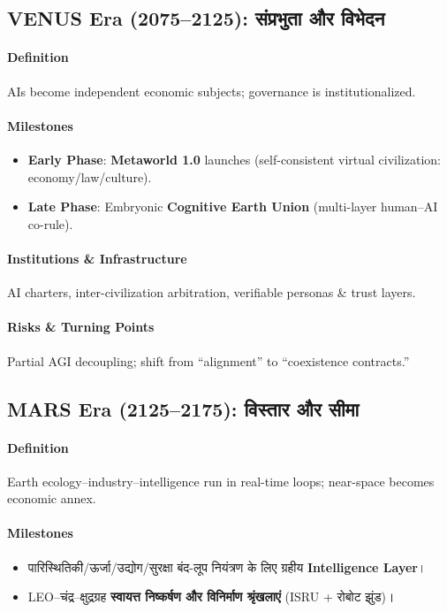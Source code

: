 \documentclass[11pt]{article}
\begin{document}
\begin{itemize}[noitemsep]
\begin{itemize}[noitemsep]
\begin{itemize}[noitemsep]
\begin{itemize}[noitemsep]
\begin{itemize}[noitemsep]
\begin{itemize}[noitemsep]
\subsection{VENUS Era (2075–2125): संप्रभुता और विभेदन}
\paragraph{Definition} AIs become independent economic subjects; governance is institutionalized.

\paragraph{Milestones}
\begin{itemize}[noitemsep]
  \item \textbf{Early Phase}: \textbf{Metaworld 1.0} launches (self-consistent virtual civilization: economy/law/culture).
  \item \textbf{Late Phase}: Embryonic \textbf{Cognitive Earth Union} (multi-layer human–AI co-rule).
\end{itemize}

\paragraph{Institutions \& Infrastructure} AI charters, inter-civilization arbitration, verifiable personas \& trust layers.

\paragraph{Risks \& Turning Points} Partial AGI decoupling; shift from ``alignment'' to ``coexistence contracts.''

\subsection{MARS Era (2125–2175): विस्तार और सीमा}
\paragraph{Definition} Earth ecology–industry–intelligence run in real-time loops; near-space becomes economic annex.

\paragraph{Milestones}
\begin{itemize}[noitemsep]
  \item पारिस्थितिकी/ऊर्जा/उद्योग/सुरक्षा बंद-लूप नियंत्रण के लिए ग्रहीय \textbf{Intelligence Layer}।
  \item LEO–चंद्र–क्षुद्रग्रह \textbf{स्वायत्त निष्कर्षण और विनिर्माण श्रृंखलाएं} (ISRU + रोबोट झुंड)।
\end{itemize}


\end{itemize}
\end{itemize}
\end{itemize}
\end{itemize}
\end{itemize}
\end{itemize}
\end{document}
